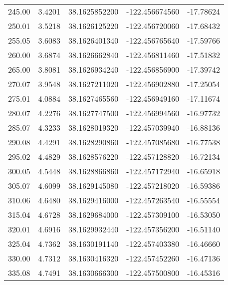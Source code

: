 \begin{scriptsize}
\begin{longtable}{p{2.5cm}p{2.5cm}p{3cm}p{3cm}p{2.5cm}}
           245.00  & 	 3.4201 &               38.1625852200  &   -122.456674560   &	-17.78624 \\
           250.01  & 	 3.5218 &               38.1626125220  &   -122.456720060   &	-17.68432 \\
           255.05  & 	 3.6083 &               38.1626401340  &   -122.456765640   &	-17.59766 \\
           260.00  & 	 3.6874 &               38.1626662840  &   -122.456811460   &	-17.51832 \\
           265.00  & 	 3.8081 &               38.1626934240  &   -122.456856900   &	-17.39742 \\
           270.07  & 	 3.9548 &               38.1627211020  &   -122.456902880   &	-17.25054 \\
           275.01  & 	 4.0884 &               38.1627465560  &   -122.456949160   &	-17.11674 \\
           280.07  & 	 4.2276 &               38.1627747500  &   -122.456994560   &	-16.97732 \\
           285.07  & 	 4.3233 &               38.1628019320  &   -122.457039940   &	-16.88136 \\
           290.08  & 	 4.4291 &               38.1628290860  &   -122.457085680   &	-16.77538 \\
           295.02  & 	 4.4829 &               38.1628576220  &   -122.457128820   &	-16.72134 \\
           300.05  & 	 4.5448 &               38.1628866860  &   -122.457172940   &	-16.65918 \\
           305.07  & 	 4.6099 &               38.1629145080  &   -122.457218020   &	-16.59386 \\
           310.06  & 	 4.6480 &               38.1629416000  &   -122.457263540   &	-16.55554 \\
           315.04  & 	 4.6728 &               38.1629684000  &   -122.457309100   &	-16.53050 \\
           320.01  & 	 4.6916 &               38.1629932440  &   -122.457356200   &	-16.51140 \\
           325.04  & 	 4.7362 &               38.1630191140  &   -122.457403380   &	-16.46660 \\
           330.00  & 	 4.7312 &               38.1630416320  &   -122.457452260   &	-16.47136 \\
           335.08  & 	 4.7491 &               38.1630666300  &   -122.457500800   &	-16.45316 \\

\end{longtable}
\end{scriptsize}
